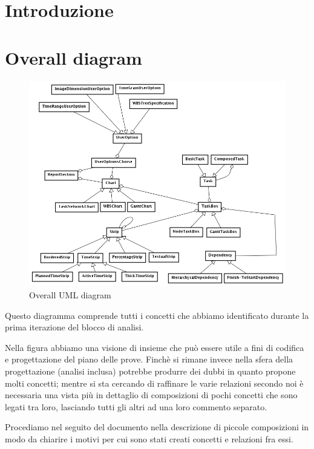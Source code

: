 \documentclass[a4paper, 12pt]{article}
\begin{document}
\newpage

\tableofcontents

\newpage

\section*{Introduzione}

\newpage

\section{Overall diagram}
\begin{figure}[h!] 
	\centering
	\includegraphics[width=1\textwidth]{../DomainModel.png}
	\caption{Overall UML diagram}
	\label{fig:overallDiagram} 
\end{figure}

Questo diagramma comprende tutti i concetti che abbiamo identificato durante la
prima iterazione del blocco di analisi. 

Nella figura abbiamo una visione di insieme che pu\`o essere utile a fini di
codifica e progettazione del piano delle prove. Finch\`e si rimane invece nella
sfera della progettazione (analisi inclusa) potrebbe produrre dei dubbi in
quanto propone molti concetti; mentre si sta cercando di raffinare le varie relazioni
secondo noi \`e necessaria una vista pi\`u in dettaglio di composizioni
di pochi concetti che sono legati tra loro, lasciando tutti gli altri ad una
loro commento separato.

Procediamo nel seguito del documento nella descrizione di piccole composizioni
in modo da chiarire i motivi per cui sono stati creati concetti e relazioni fra
essi.








\end{document}
